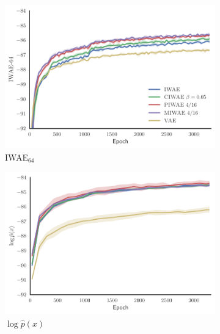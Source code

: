 \begin{figure}[h]
	\centering
   	\begin{subfigure}[b]{0.33\textwidth}
        \centering
        \includegraphics[width=\textwidth]{figures/tighter_bounds/optim_convergence_IWAE_64}
        \caption{\textsc{IWAE}$_{64}$ \label{fig-app:mnistexpt/convergence/iwae64}}
    \end{subfigure}
	\begin{subfigure}[b]{0.33\textwidth}
		\centering
		\includegraphics[width=\textwidth]{figures/tighter_bounds/optim_convergence_log_p(x)}
		\caption{$\log \hat{p}(x)$ \label{fig-app:mnistexpt/convergence/logpx}}
	\end{subfigure}
	\begin{subfigure}[b]{0.33\textwidth}
		\centering

\end{subfigure}
\end{figure}
